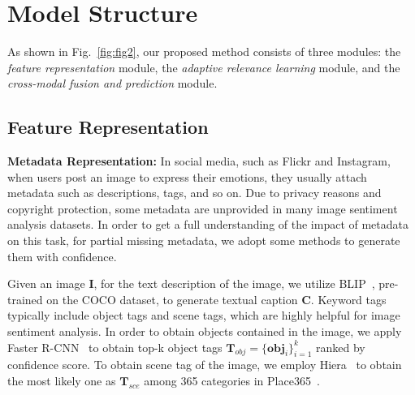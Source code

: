 \section{Model Structure}
\label{s:method}



As shown in Fig.~\ref{fig:fig2}, our proposed method consists of three modules:
the \textit{feature representation} module, the \textit{adaptive relevance learning} module, and the \textit{cross-modal fusion and prediction} module.

\subsection{Feature Representation}
\textbf{Metadata Representation:}
In social media, such as Flickr and Instagram, when users post an image to express their emotions, 
they usually attach metadata such as descriptions, tags, and so on.
Due to privacy reasons and copyright protection, some metadata are unprovided in many image sentiment analysis datasets. In order to get a full understanding of the impact of metadata on this task, for partial missing metadata, we adopt some methods to generate them with confidence.

Given an image $\bm{I}$, for the text description of the image, we utilize BLIP~\cite{li2022blip}, pre-trained on the COCO dataset, to generate textual caption $\bm{C}$.
Keyword tags typically include object tags and scene tags, which are highly helpful for image sentiment analysis.
In order to obtain objects contained in the image, we apply Faster R-CNN~\cite{ren2015faster} to obtain top-k object tags $\bm{T}_{obj}=\{\bm{obj}_{i}\}_{i=1}^{k}$ ranked by confidence score.
To obtain scene tag of the image, we employ Hiera~\cite{ryali2023hiera} to obtain the most likely one as $\bm{T}_{sce}$ among 365 categories in Place365~\cite{zhou2017places}.


